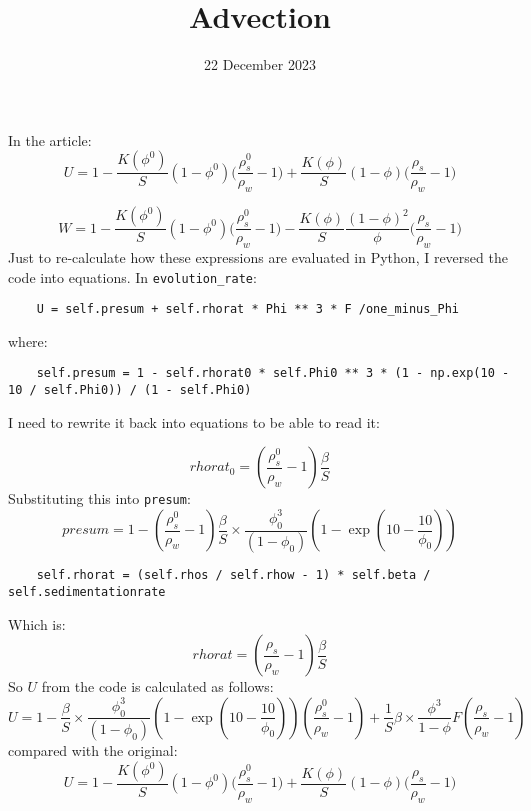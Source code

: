 \documentclass[11pt, letterpaper]{article}
\title{Advection}
\date{22 December 2023}
\begin{document}
\maketitle

In the article:
\begin{equation}
    U = 1 - \frac{K(\phi^0)}{S}(1-\phi^0)\big(\frac{\rho_s^0}{\rho_w} - 1 \big) + \frac{K(\phi)}{S}(1-\phi) \big(\frac{\rho_s}{\rho_w}-1\big)
\end{equation}

\begin{equation}
    W = 1 - \frac{K(\phi^0)}{S}(1-\phi^0) \big(\frac{\rho_s^0}{\rho_w}-1) - \frac{K(\phi)}{S} \frac{(1-\phi)^2}{\phi}\big(\frac{\rho_s}{\rho_w}-1\big)
\end{equation}
Just to re-calculate how these expressions are evaluated in Python, I reversed the code into equations.
In \verb|evolution_rate|:
\begin{verbatim}
    U = self.presum + self.rhorat * Phi ** 3 * F /one_minus_Phi
\end{verbatim}
where:
\begin{verbatim}
    self.presum = 1 - self.rhorat0 * self.Phi0 ** 3 * (1 - np.exp(10 - 10 / self.Phi0)) / (1 - self.Phi0)     
\end{verbatim}

I need to rewrite it back into equations to be able to read it:

\begin{equation}
    rhorat_0 = (\frac{\rho_s^0}{\rho_w} - 1) \frac{\beta}{S}
\end{equation}
Substituting this into \verb|presum|:
\begin{equation}
    presum = 1 - (\frac{\rho_s^0}{\rho_w} - 1) \frac{\beta}{S} \times \frac{\phi_0^3}{(1 - \phi_0)} \left(1 - \exp\left(10 - \frac{10}{\phi_0} \right) \right)  
\end{equation}
\begin{verbatim}
    self.rhorat = (self.rhos / self.rhow - 1) * self.beta / self.sedimentationrate
\end{verbatim}
Which is:
\begin{equation}
    rhorat = (\frac{\rho_s}{\rho_w} - 1)\frac{\beta}{S}
\end{equation}
So $U$ from the code is calculated as follows:
\begin{equation}
    U = 1 - \frac{\beta}{S} \times \frac{\phi_0^3}{(1 - \phi_0)} \left(1 - \exp\left(10 - \frac{10}{\phi_0} \right) \right)(\frac{\rho_s^0}{\rho_w} - 1) + \frac{1}{S}\beta \times\frac{\phi^3}{1-\phi} F (\frac{\rho_s}{\rho_w} - 1)
\end{equation}
compared with the original:
\begin{equation}
    U = 1 - \frac{K(\phi^0)}{S}(1-\phi^0)\big(\frac{\rho_s^0}{\rho_w} - 1 \big) + \frac{K(\phi)}{S}(1-\phi) \big(\frac{\rho_s}{\rho_w}-1\big)
\end{equation}
\end{document}
